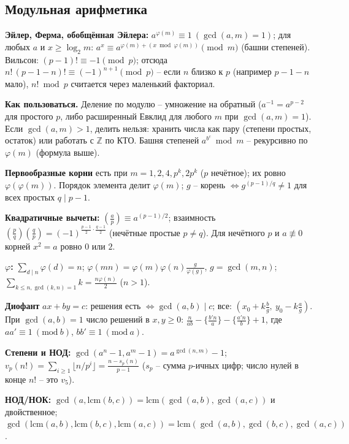 \subsection{Модульная арифметика}
\textbf{Эйлер, Ферма, обобщённая Эйлера:} $a^{\varphi(m)}\equiv1\ (\gcd(a,m){=}1)$; для любых $a$ и $x\ge\log_2m$: $a^x\equiv a^{\varphi(m)+(x\bmod\varphi(m))}\pmod m$ (башни степеней). Вильсон: $(p{-}1)!\equiv-1\pmod p$; отсюда $n!\,(p{-}1{-}n)!\equiv(-1)^{n+1}\pmod p$ -- если $n$ близко к $p$ (например $p{-}1{-}n$ мало), $n!\bmod p$ считается через маленький факториал.
\par \textbf{Как пользоваться.} Деление по модулю -- умножение на обратный ($a^{-1}=a^{p-2}$ для простого $p$, либо расширенный Евклид для любого $m$ при $\gcd(a,m)=1$). Если $\gcd(a,m)>1$, делить нельзя: хранить числа как пару (степени простых, остаток) или работать с $\mathbb Z$ по КТО. Башня степеней $a^{b^c}\bmod m$ -- рекурсивно по $\varphi(m)$ (формула выше).
\par \textbf{Первообразные корни} есть при $m=1,2,4,p^k,2p^k$ ($p$ нечётное); их ровно $\varphi(\varphi(m))$. Порядок элемента делит $\varphi(m)$; $g$ -- корень $\iff g^{(p-1)/q}\ne1$ для всех простых $q\mid p{-}1$.
\par \textbf{Квадратичные вычеты:} $\left(\frac ap\right)\equiv a^{(p-1)/2}$; взаимность $\left(\frac pq\right)\left(\frac qp\right)=(-1)^{\frac{p-1}2\cdot\frac{q-1}2}$ (нечётные простые $p\ne q$). Для нечётного $p$ и $a\not\equiv0$ корней $x^2{=}a$ ровно $0$ или $2$.
\par \textbf{$\varphi$:} $\sum_{d\mid n}\varphi(d)=n$; $\varphi(mn)=\varphi(m)\varphi(n)\frac{g}{\varphi(g)}$, $g=\gcd(m,n)$; $\sum_{k\le n,\gcd(k,n)=1}k=\frac{n\varphi(n)}2$ ($n>1$).
\par \textbf{Диофант} $ax+by=c$: решения есть $\iff\gcd(a,b)\mid c$; все: $(x_0+k\frac b g,\ y_0-k\frac ag)$. При $\gcd(a,b)=1$ число решений в $x,y\ge0$: $\frac n{ab}-\{\frac{b'n}a\}-\{\frac{a'n}b\}+1$, где $aa'\equiv1\ (\mathrm{mod}\ b)$, $bb'\equiv1\ (\mathrm{mod}\ a)$.
\par \textbf{Степени и НОД:} $\gcd(a^n-1,a^m-1)=a^{\gcd(n,m)}-1$; $v_p(n!)=\sum_{i\ge1}\lfloor n/p^i\rfloor=\frac{n-s_p(n)}{p-1}$ ($s_p$ -- сумма $p$-ичных цифр; число нулей в конце $n!$ -- это $v_5$).
\par \textbf{НОД/НОК:} $\gcd(a,\mathrm{lcm}(b,c))=\mathrm{lcm}(\gcd(a,b),\gcd(a,c))$ и двойственное; $\gcd(\mathrm{lcm}(a,b),\mathrm{lcm}(b,c),\mathrm{lcm}(a,c))=\mathrm{lcm}(\gcd(a,b),\gcd(b,c),\gcd(a,c))$.

